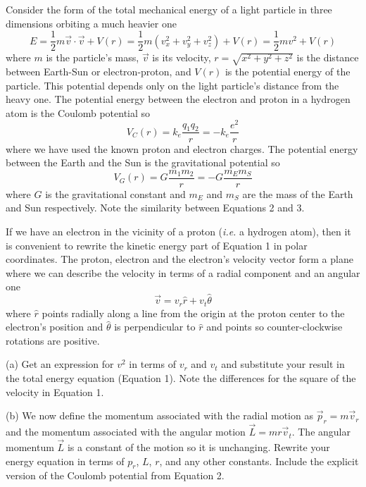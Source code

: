 Consider the form of the total
mechanical energy of a light particle in three dimensions 
orbiting a much heavier one
\begin{equation}
E = \frac{1}{2} m \vec v \cdot \vec v + V(r) = 
   \frac{1}{2} m (v_x^2 + v_y^2 + v_z^2) + V(r) = 
   \frac{1}{2} m v^2 + V(r) 
\end{equation}
where $m$ is the particle's mass, $\vec v$ is its
velocity, $r=\sqrt{x^2 + y^2 + z^2}$ is the distance between Earth-Sun or electron-proton, 
and  $V(r)$ is the potential energy of the particle.
This potential depends only on the light particle's distance from the heavy one.
The potential energy between the electron and proton in a hydrogen atom is 
the Coulomb potential so
\begin{equation}
V_C(r) = k_e \frac{q_1 q_2}{r} =  
   - k_e \frac{e^2}{r} 
\end{equation}
where we have used the known proton and electron charges.
The potential energy between the Earth and the Sun is 
the gravitational potential so
\begin{equation}
V_G(r) = G\frac{m_1 m_2}{r} =  
   - G \frac{m_E m_S}{r} 
\end{equation}
where $G$ is the gravitational constant and $m_E$ and $m_S$ are the
mass of the Earth and Sun respectively. Note the similarity between Equations 2 and 3.

If we have an electron in the vicinity of a proton ({\it i.e.} a hydrogen atom), then
it is convenient to rewrite the kinetic energy part of Equation 1 in polar coordinates.
The proton, electron and the electron's velocity vector 
form a plane where we can describe the velocity in terms
of a radial component and an angular one
\begin{equation}
\vec v = v_r \hat r + v_t \hat \theta
\end{equation}
where $\hat r$ points radially along a line from the origin at the proton center
to the electron's position
and $\hat \theta$ is perpendicular to $\hat r$ and points so counter-clockwise rotations
are positive.

\newpage

(a) Get an expression for $v^2$ in terms of
$v_r$ and $v_t$ and substitute your result in the total energy equation (Equation 1).
Note the differences for the square of the velocity in Equation 1.
\answerspace{2.0cm}

(b) We now define the momentum associated with  the radial motion
as $\vec p_r = m\vec v_r$
and the momentum associated with the angular motion $\vec L = mr\vec v_t$.
The angular momentum $\vec L$ is a constant of the motion so it is unchanging.
Rewrite your energy equation in terms of $p_r$, $L$, $r$, and any other constants.
Include the explicit version of the Coulomb potential from Equation 2.
\answerspace{3.0cm}


